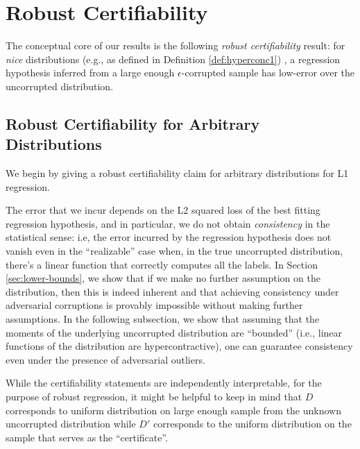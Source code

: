 

\section{Robust Certifiability} \label{sec:robust-certifiability}

The conceptual core of our results is the following \emph{robust certifiability} result: for \emph{nice} distributions (e.g., as defined in Definition \ref{def:hyperconc1})%
, a regression hypothesis inferred from a large enough $\epsilon$-corrupted sample has low-error over the uncorrupted distribution.

\subsection{Robust Certifiability for Arbitrary Distributions}
We begin by giving a robust certifiability claim for arbitrary distributions for L1 regression.

 The error that we incur depends on the L2 squared loss of the best fitting regression hypothesis, and in particular, we do not obtain \emph{consistency} in the statistical sense: i.e, the error incurred by the regression hypothesis does not vanish even in the ``realizable'' case when, in the true uncorrupted distribution, there's a linear function that correctly computes all the labels. In Section \ref{sec:lower-bounds}, we show that if we make no further assumption on the distribution, then this is indeed inherent and that achieving consistency under adversarial corruptions is provably impossible without making further assumptions. In the following subsection, we show that assuming that the moments of the underlying uncorrupted distribution are ``bounded'' (i.e., linear functions of the distribution are hypercontractive), one can guarantee consistency even under the presence of adversarial outliers.

 While the certifiability statements are independently interpretable, for the purpose of robust regression, it might be helpful to keep in mind that $D$ corresponds to uniform distribution on large enough sample from the unknown uncorrupted distribution while $D'$ corresponds to the uniform distribution on the sample that serves as the ``certificate''. %


